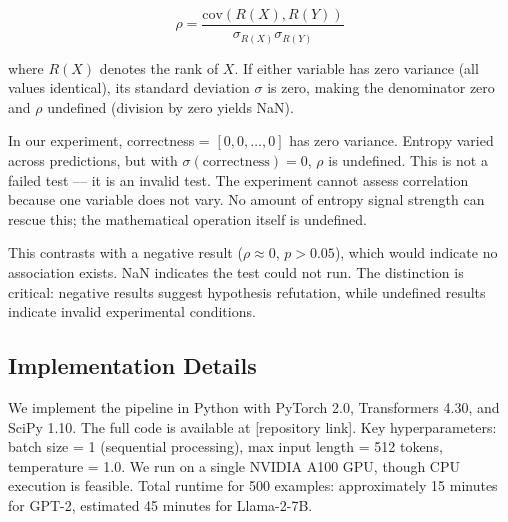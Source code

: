 \begin{equation}
\rho = \frac{\text{cov}(R(X), R(Y))}{\sigma_{R(X)} \sigma_{R(Y)}}
\end{equation}

where $R(X)$ denotes the rank of $X$. If either variable has zero variance (all values identical), its standard deviation $\sigma$ is zero, making the denominator zero and $\rho$ undefined (division by zero yields NaN).

In our experiment, correctness = $[0, 0, \ldots, 0]$ has zero variance. Entropy varied across predictions, but with $\sigma(\text{correctness}) = 0$, $\rho$ is undefined. This is not a failed test --- it is an invalid test. The experiment cannot assess correlation because one variable does not vary. No amount of entropy signal strength can rescue this; the mathematical operation itself is undefined.

This contrasts with a negative result ($\rho \approx 0$, $p > 0.05$), which would indicate no association exists. NaN indicates the test could not run. The distinction is critical: negative results suggest hypothesis refutation, while undefined results indicate invalid experimental conditions.

\subsection{Implementation Details}

We implement the pipeline in Python with PyTorch 2.0, Transformers 4.30, and SciPy 1.10. The full code is available at [repository link]. Key hyperparameters: batch size = 1 (sequential processing), max input length = 512 tokens, temperature = 1.0. We run on a single NVIDIA A100 GPU, though CPU execution is feasible. Total runtime for 500 examples: approximately 15 minutes for GPT-2, estimated 45 minutes for Llama-2-7B.

